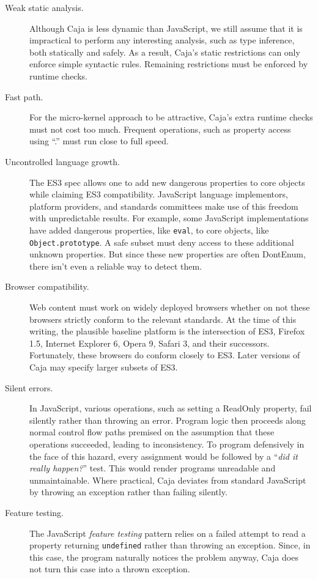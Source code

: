 \documentclass[letterpaper,twocolumn,10pt]{article}
\newcommand{\code}[1]{{\tt {#1}}}              %
\begin{document}
\begin{description}
  \item[Weak static analysis.] Although Caja is less dynamic than JavaScript, 
  we still assume that it is impractical to perform any interesting analysis, 
  such as type inference, both statically and safely. As a result, Caja's 
  static restrictions can only enforce simple syntactic rules. Remaining 
  restrictions must be enforced by runtime checks.
  
  \item[Fast path.] For the micro-kernel approach to be attractive, Caja's 
  extra runtime checks must not cost too much. Frequent operations, such as 
  property access using ``.'' must run close to full speed.
  
  \item[Uncontrolled language growth.] The ES3 spec allows one to add new 
  dangerous properties to core objects while claiming ES3 compatibility. 
  JavaScript language implementors, platform providers, and standards 
  committees make use of this freedom with unpredictable results. For 
  example, some JavaScript implementations have added dangerous properties, 
  like \code{eval}, to core objects, like \code{Object.prototype}. A safe 
  subset must deny access to these additional unknown properties. But since 
  these new properties are often DontEnum, there isn't even a reliable way to 
  detect them.
  
  \item[Browser compatibility.] Web content must work on widely deployed 
  browsers whether on not these browsers strictly conform to the relevant 
  standards. At the time of this writing, the plausible baseline platform is 
  the intersection of ES3, Firefox 1.5, Internet Explorer 6, Opera 9, Safari 
  3, and their successors. Fortunately, these browsers do conform closely to 
  ES3. Later versions of Caja may specify larger subsets of ES3.
  
  \item[Silent errors.] In JavaScript, various operations, such as setting a 
  ReadOnly property, fail silently rather than throwing an error. Program 
  logic then proceeds along normal control flow paths premised on the 
  assumption that these operations succeeded, leading to inconsistency. To 
  program defensively in the face of this hazard, every assignment would be 
  followed by a ``\emph{did it really happen?}'' test. This would render 
  programs unreadable and unmaintainable. Where practical, Caja deviates from 
  standard JavaScript by throwing an exception rather than failing silently.
  
  \item[Feature testing.] The JavaScript \emph{feature testing} pattern 
  relies on a failed attempt to read a property returning \code{undefined} 
  rather than throwing an exception. Since, in this case, the program 
  naturally notices the problem anyway, Caja does not turn this case into a 
  thrown exception.
    
\end{description}
\end{document}
